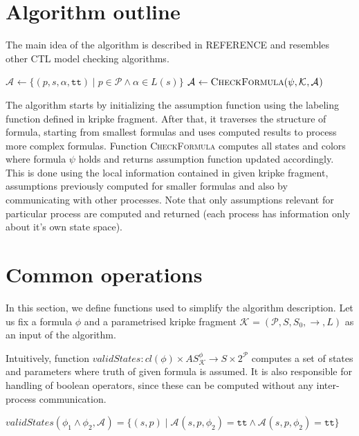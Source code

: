 \documentclass[12pt,oneside,draft]{fithesis2}
\newcommand{\as}[1][]{\ensuremath{\mathcal{A}_{#1}}}
\newcommand{\ASphi}{\ensuremath{AS_{\mathcal K}^\phi}}
\newcommand{\method}[1]{\textnormal{\textsc{#1}}}
\newcommand{\true}{\ensuremath{\texttt{tt}}}
\newcommand{\ks}[1][]{\ensuremath{\mathcal{K}_{#1}}}
\newcommand{\fullKs}{\ensuremath{ \ks = (\params, S, S_0, \trans{}, L) }}
\newcommand{\trans}[1]{\stackrel{#1}{\rightarrow}}
\newcommand{\params}{\mathcal{P}}
\begin{document}
		\section{Algorithm outline}
		
			The main idea of the algorithm is described in REFERENCE and resembles other CTL model checking algorithms.
			
			\begin{algorithmic}[1]
				\Procedure{CheckCTL}{$ \phi, \fullKs $}
					\State $ \as \gets \{ (p, s, \alpha, \true) \mid  p \in \params \wedge \alpha \in L(s) \}$ 
							\State $ \as \gets \Call{CheckFormula}{\psi, \ks, \as } $
						\EndFor
					\EndFor
				\EndProcedure			
			\end{algorithmic} 
			
			The algorithm starts by initializing the assumption function using the labeling function defined in kripke fragment. After that, it traverses the structure of formula, starting from smallest formulas and uses computed results to process more complex formulas. Function \method{CheckFormula} computes all states and colors where formula $\psi$ holds and returns assumption function updated accordingly. This is done using the local information contained in given kripke fragment, assumptions previously computed for smaller formulas and also by communicating with other processes. Note that only assumptions relevant for particular process are computed and returned (each process has information only about it's own state space).
    	
    	\section{Common operations}
    		
    		In this section, we define functions used to simplify the algorithm description. Let us fix a formula $\phi$ and a parametrised kripke fragment $\fullKs$ as an input of the algorithm.
			
			Intuitively, function $validStates : cl(\phi) \times \ASphi \rightarrow S \times 2^\mathcal{P} $ computes a set of states and parameters where truth of given formula is assumed. It is also responsible for handling of boolean operators, since these can be computed without any inter-process communication. 
			
			\begin{center}
				$validStates(\phi_1 \wedge \phi_2, \as) = \{ (s, p) \mid \as(s, p, \phi_2) = \true \wedge \as(s, p, \phi_2) = \true \} $
			\end{center}
			
\end{document}
